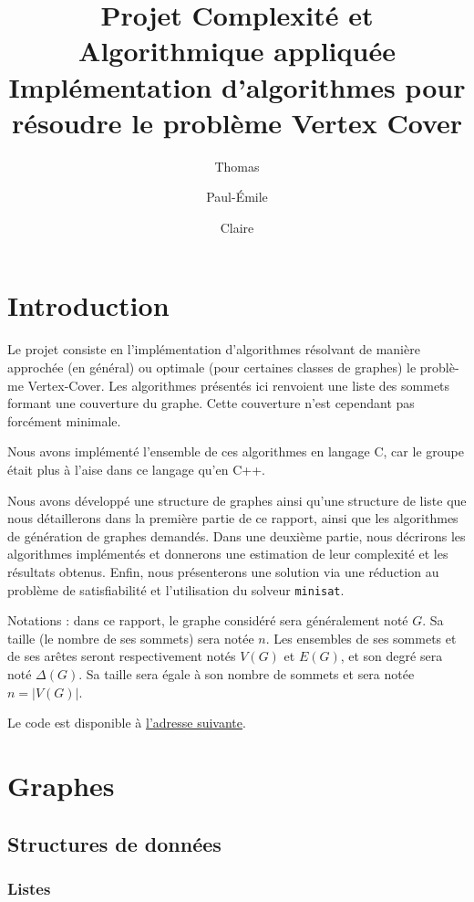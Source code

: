 \documentclass[a4paper,10pt]{article}
\title{Projet Complexité et Algorithmique appliquée\\ Implémentation d'algorithmes pour résoudre le problème Vertex Cover}
\author{Thomas \bsc{Bellitto}\and Paul-Émile \bsc{Boutoille} \and Claire \bsc{Pennarun}}
\date{}
\begin{document}
\maketitle

\section*{Introduction}

Le projet consiste en l'implémentation d'algorithmes résolvant de manière approchée (en général) ou optimale (pour certaines classes de graphes) le problè-me Vertex-Cover.
Les algorithmes présentés ici renvoient une liste des sommets formant une couverture du graphe. Cette couverture n'est cependant pas forcément minimale.

Nous avons implémenté l'ensemble de ces algorithmes en langage C, car le groupe était plus à l'aise dans ce langage qu'en C++.

Nous avons développé une structure de graphes ainsi qu'une structure de liste que nous détaillerons dans la première partie de ce rapport, ainsi que les algorithmes de génération de graphes demandés.
Dans une deuxième partie, nous décrirons les algorithmes implémentés et donnerons une estimation de leur complexité et les résultats obtenus.
Enfin, nous présenterons une solution via une réduction au problème de satisfiabilité et l'utilisation du solveur \texttt{minisat}.

Notations : dans ce rapport, le graphe considéré sera généralement noté $G$. Sa taille (le nombre de ses sommets) sera notée $n$. Les ensembles de ses sommets et de ses arêtes seront respectivement notés $V(G)$ et $E(G)$, et son degré sera noté $\Delta (G)$. Sa taille sera égale à son nombre de sommets et sera notée $n = |V(G)|$.

Le code est disponible à \href{http://github.com/ClairePennarun/CAA_Vertex_Cover }{l'adresse suivante}.

\section{Graphes}

\subsection{Structures de données}

\subsubsection{Listes}
\end{document}
